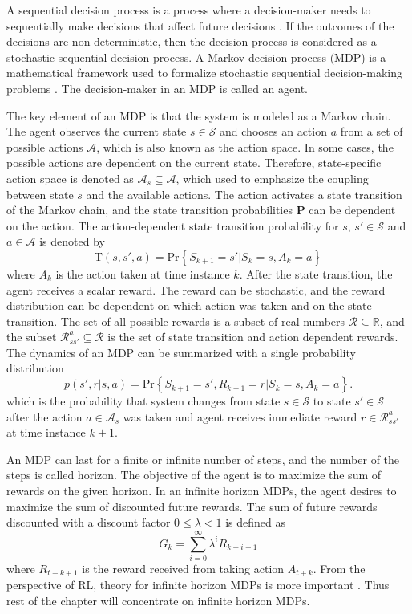 \documentclass[english, 12pt, a4paper, elec, utf8, a-1b, online]{aaltothesis}
\renewcommand{\vec}[1]{\mathbf{#1}}
\newcommand{\Ss}{\mathcal{S}}
\newcommand{\As}{\mathcal{A}}
\newcommand{\Rs}{\mathcal{R}}
\renewcommand{\Pr}[1]{\text{Pr}\left\{ #1 \right\}}
\newcommand{\stprobs}{\vec{P}}
\newcommand{\real}{\mathbb{R}}
\begin{document}
A sequential decision process is a process where a decision-maker needs to sequentially make decisions that affect future decisions \cite{LaValle2006}.
If the outcomes of the decisions are non-deterministic, then the decision process is considered as a stochastic sequential decision process.
A Markov decision process (MDP) is a mathematical framework used to formalize stochastic sequential decision-making problems \cite{Sutton2018}.
The decision-maker in an MDP is called an agent.

The key element of an MDP is that the system is modeled as a Markov chain.
The agent observes the current state $s \in \Ss$ and chooses an action $a$ from a set of possible actions $\As$, which is also known as the action space.
In some cases, the possible actions are dependent on the current state.
Therefore, state-specific action space is denoted as $\As_s \subseteq \As$, which used to emphasize the coupling between state $s$ and the available actions. 
The action activates a state transition of the Markov chain, and the state transition probabilities $\stprobs$ can be dependent on the action.
The action-dependent state transition probability for $s$, $s' \in \Ss$ and $a \in \As$ is denoted by 
\begin{equation}\label{eq:mdp_st_prob}
    \mathrm{T}(s, s', a) = \Pr{S_{k+1}=s' | S_{k}=s , A_k=a}
\end{equation}
where $A_k$ is the action taken at time instance $k$.  
After the state transition, the agent receives a scalar reward.
The reward can be stochastic, and the reward distribution can be dependent on which action was taken and on the state transition.
The set of all possible rewards is a subset of real numbers $\Rs \subseteq \real$, and the subset $\Rs_{ss'}^a \subseteq \Rs$ is the set of state transition and action dependent rewards.
The dynamics of an MDP can be summarized with a single probability distribution
\begin{equation}\label{eq:MDP_probs}
    p(s', r | s, a) = \Pr{ S_{k+1}=s', R_{k+1}=r | S_k=s, A_k=a }.
\end{equation}
which is the probability that system changes from state $s \in \Ss$ to state $s' \in \Ss$ after the action $a \in \As_s$ was taken and agent receives immediate reward $r \in \Rs_{ss'}^a$ at time instance $k+1$.

An MDP can last for a finite or infinite number of steps, and the number of the steps is called horizon.
The objective of the agent is to maximize the sum of rewards on the given horizon.
In an infinite horizon MDPs, the agent desires to maximize the sum of discounted future rewards.
The sum of future rewards discounted with a discount factor $0 \leq \lambda < 1$ is defined as
\begin{equation}\label{eq:discounted_sum}
    G_k = \sum_{i=0}^{\infty} \lambda^i R_{k + i + 1}
\end{equation}
where $R_{t+k+1}$ is the reward received from taking action $A_{t+k}$. 
From the perspective of RL, theory for infinite horizon MDPs is more important \cite{Sutton2018}. Thus rest of the chapter will concentrate on infinite horizon MDPs.
\end{document}
